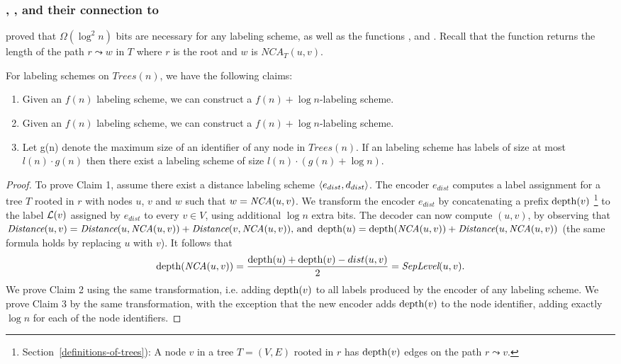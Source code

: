 	\subsubsection{\NCA, \seplevel, and their connection to \distance }
		 proved that  $\Omega(\log^2 n)$ bits are necessary for any \NCAf labeling scheme, as well as the functions \seplevel, and \centerf.
		Recall that the function \seplevel returns the length of the path  $r \leadsto w $ in $T$ where $r$ is the root and $w$ is $NCA_T(u,v)$.
			\begin{theorem} \cite{Peleg05}\label{NCAconnection}
			For  labeling schemes  on $Trees(n)$, we have the following claims:
			\mbox{}
			\begin{enumerate}
						\item Given an  $f(n)$ \distance labeling scheme, we can construct a $f(n)+\log n$-\seplevel labeling scheme.
			\item Given an  $f(n)$ \seplevel labeling scheme, we can construct a $f(n)+\log n$-\distance labeling scheme.
			\item Let g(n) denote the maximum size of an identifier of any node in $Trees(n)$. If an \NCAf labeling scheme has labels of size at most  $l(n) \cdot g(n)$ then  there exist a \seplevel labeling scheme of size  $ l(n) \cdot (g(n) + \log n).$ 
			\end{enumerate}
			\end{theorem}
			\begin{proof}
			To prove Claim 1, assume there exist a distance labeling scheme  $\left \langle e_{dist},d_{dist} \right \rangle $. 
			The encoder  $e_{dist}$ computes a label assignment  for a tree  $T$ rooted in $r$ with nodes $u$, $v$ and $w$ such that  $w= \emph{NCA}(u,v)$.
			We transform the encoder $e_{dist}$ by concatenating a prefix  $\operatorname{depth}(v)$
			\footnote{ Section~\ref{definitions-of-trees}): A node $v$ in a tree $T=(V,E)$ rooted in $r$ has  $\operatorname{depth}(v)$  edges on the path $r \leadsto v$.}  to the label $ \mathcal{L}(v)$ assigned by $e_{dist}$ to every $v \in V$, using additional  $\log n$ extra bits.
			The decoder can now compute \seplevel$(u,v)$, by   observing that 
			$\distance(u,v) = \distance(u,\NCA(u,v))+\distance(v,\NCA(u,v)) \text{, and } \depth(u)=\depth(\NCA(u,v))+\distance(u,\NCA(u,v))$
			 (the same formula holds by replacing $u$ with $v$).
			 It follows that  $$\operatorname{depth}(\emph{NCA}(u,v)) =  \frac{\operatorname{depth}(u)+\operatorname{depth}(v)-dist(u,v)}{2} = \emph{SepLevel}(u,v).$$
			 We prove Claim 2  using the same transformation, i.e. adding $\operatorname{depth}(v)$	 to all labels produced by the encoder of any \seplevel labeling scheme.  
			 We prove Claim 3  by the same transformation, with the exception that  the new encoder adds $\operatorname{depth}(v)$ to the node identifier, adding exactly $\log n$ for  each of the node identifiers.
			\end{proof}
			
